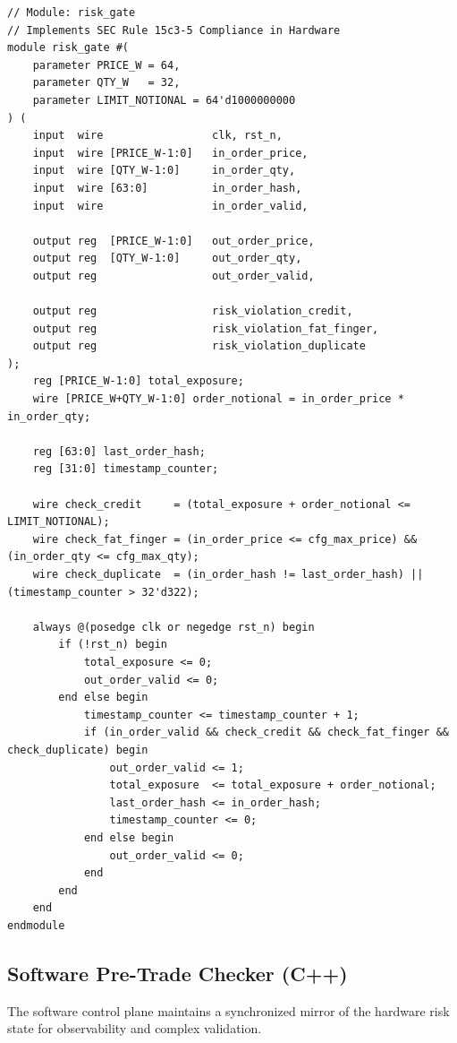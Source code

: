 \begin{lstlisting}[style=verilogstyle, caption={Wire-speed risk gate implementation}, label={lst:riskgate}]
// Module: risk_gate
// Implements SEC Rule 15c3-5 Compliance in Hardware
module risk_gate #(
    parameter PRICE_W = 64,
    parameter QTY_W   = 32,
    parameter LIMIT_NOTIONAL = 64'd1000000000 
) (
    input  wire                 clk, rst_n,
    input  wire [PRICE_W-1:0]   in_order_price,
    input  wire [QTY_W-1:0]     in_order_qty,
    input  wire [63:0]          in_order_hash,
    input  wire                 in_order_valid,
    
    output reg  [PRICE_W-1:0]   out_order_price,
    output reg  [QTY_W-1:0]     out_order_qty,
    output reg                  out_order_valid,
    
    output reg                  risk_violation_credit,
    output reg                  risk_violation_fat_finger,
    output reg                  risk_violation_duplicate
);
    reg [PRICE_W-1:0] total_exposure;
    wire [PRICE_W+QTY_W-1:0] order_notional = in_order_price * in_order_qty;
    
    reg [63:0] last_order_hash;
    reg [31:0] timestamp_counter;

    wire check_credit     = (total_exposure + order_notional <= LIMIT_NOTIONAL);
    wire check_fat_finger = (in_order_price <= cfg_max_price) && (in_order_qty <= cfg_max_qty);
    wire check_duplicate  = (in_order_hash != last_order_hash) || (timestamp_counter > 32'd322);

    always @(posedge clk or negedge rst_n) begin
        if (!rst_n) begin
            total_exposure <= 0;
            out_order_valid <= 0;
        end else begin
            timestamp_counter <= timestamp_counter + 1;
            if (in_order_valid && check_credit && check_fat_finger && check_duplicate) begin
                out_order_valid <= 1;
                total_exposure  <= total_exposure + order_notional;
                last_order_hash <= in_order_hash;
                timestamp_counter <= 0;
            end else begin
                out_order_valid <= 0;
            end
        end
    end
endmodule
\end{lstlisting}

\subsection{Software Pre-Trade Checker (C++)}
The software control plane maintains a synchronized mirror of the hardware risk state for observability and complex validation.

